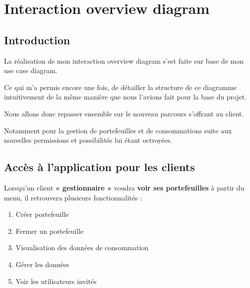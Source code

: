 \section{Interaction overview diagram}

\subsection{Introduction}

\begin{flushleft}
La réalisation de mon interaction overview diagram s'est faite sur base de mon use case diagram. 
\end{flushleft}

\begin{flushleft}
Ce qui m'a permis encore une fois, de détailler la structure de ce diagramme intuitivement de la même manière que nous l'avions fait pour la base du projet.
\end{flushleft}

\begin{flushleft}
Nous allons donc repasser ensemble sur le nouveau parcours 
s'offrant au client.
\end{flushleft}

\begin{flushleft}
Notamment pour la gestion de portefeuilles et de consommations suite aux nouvelles permissions et possibilités lui étant 
octroyées.
\end{flushleft}

\newpage

\subsection{Accès à l'application pour les clients}

\begin{flushleft}
Lorsqu’un client \textbf{« gestionnaire »} voudra \textbf{voir ses portefeuilles} à partir du menu, il retrouvera plusieurs fonctionnalités :
\end{flushleft}

\begin{enumerate}[1.]
\item Créer portefeuille
\item Fermer un portefeuille
\item Visualisation des données de consommation
\item Gérer les données
\item Voir les utilisateurs invités
\end{enumerate}


